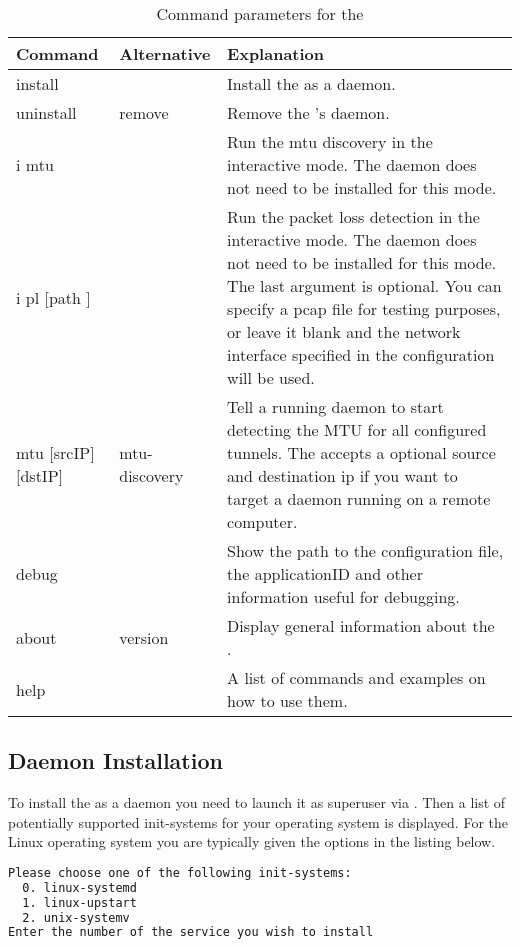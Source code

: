 \begin{table}[H]
\begin{tabularx}{\textwidth}{l|l|>{\raggedright\arraybackslash}X} 
\textbf{Command} & \textbf{Alternative} & \textbf{Explanation} \\
\hline
install &  & Install the \entool{} as a daemon.\\
uninstall & remove & Remove the \entool{}'s daemon.\\
i mtu &  & Run the mtu discovery in the interactive mode. The daemon does not need to be installed for this mode.\\
i pl [path ]&  & Run the packet loss detection in the interactive mode. The daemon does not need to be installed for this mode. The last argument is optional. You can specify a pcap file for testing purposes, or leave it blank and the network interface specified in the configuration will be used.\\
mtu [srcIP] [dstIP] & mtu-discovery & Tell a running daemon to start detecting the MTU for all configured tunnels. The \entool{} accepts a optional source and destination ip if you want to target a daemon running on a remote computer. \\
debug &  & Show the path to the configuration file, the applicationID and other information useful for debugging.\\
about & version & Display general information about the \entool{}. \\
help & & A list of commands and examples on how to use them.
\end{tabularx}
\caption{Command parameters for the \entool{}}
\end{table}

\subsection{Daemon Installation}
To install the \entool{} as a daemon you need to launch it as superuser via . Then a list of potentially supported init-systems for your operating system is displayed. For the Linux operating system you are typically given the options in the listing below.

\begin{lstlisting}[language=bash, caption=Supported linux init-systems]
Please choose one of the following init-systems:
  0. linux-systemd
  1. linux-upstart
  2. unix-systemv
Enter the number of the service you wish to install
\end{lstlisting}

